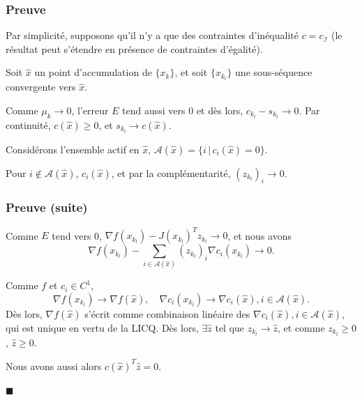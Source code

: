 \documentclass[usepdftitle=false,aspectratio=169]{beamer}
\def\cA{\mathcal{A}}
\def\cI{\mathcal{I}}
\begin{document}
\begin{frame}
\frametitle{Preuve}

Par simplicité, supposons qu'il n'y a que des contraintes d'inéqualité $c = c_{\cI}$ (le résultat peut s'étendre en présence de contraintes d'égalité).

\mbox{}

Soit $\hat{x}$ un point d'accumulation de $\{ x_k \}$, et soit $\{ x_{k_l} \}$ une sous-séquence convergente vers $\hat{x}$.

\mbox{}

Comme $\mu_k \rightarrow 0$, l'erreur $E$ tend aussi vers 0 et dès lors, $c_{k_l} - s_{k_l} \rightarrow 0$.
Par continuité, $c(\hat{x}) \geq 0$, et $s_{k_l} \rightarrow c(\hat{x})$.

\mbox{}

Considérons l'ensemble actif en $\hat{x}$, $\cA(\hat{x}) = \{ i \,|\, c_i(\hat{x}) = 0 \}$.

\mbox{}

Pour $i \notin \cA(\hat{x})$, $c_i(\hat{x})$, et par la complémentarité, $(z_{k_l})_i \rightarrow 0$.

\end{frame}

\begin{frame}
\frametitle{Preuve (suite)}

Comme $E$ tend vers 0, $\nabla f(x_{k_l}) - J(x_{k_l})^T z_{k_l} \rightarrow 0$, et nous avons
$$
\nabla f(x_{k_l}) - \sum_{i \in \cA(\hat{x})} (z_{k_l})_i \nabla c_i(x_{k_l}) \rightarrow 0.
$$

\mbox{}

Comme $f$ et $c_i \in C^1$, 
$$
\nabla f(x_{k_l}) \rightarrow \nabla f(\hat{x}), \quad
\nabla c_i(x_{k_l}) \rightarrow \nabla c_i(\hat{x}), i \in \cA(\hat{x}).
$$
Dès lors, $\nabla f(\hat{x})$ s'écrit comme combinaison linéaire des $\nabla c_i(\hat{x}), i \in \cA(\hat{x})$, qui est unique en vertu de la LICQ. Dès lors, $\exists \hat{z}$ tel que $z_{k_l} \rightarrow \hat{z}$, et comme $z_{k_l} \geq 0$, $\hat{z} \geq 0$.

\mbox{}

Nous avons aussi alors $c(\hat{x})^T \hat{z} = 0$.

\begin{flushright}
$\blacksquare$
\end{flushright}

\end{frame}
\end{document}

